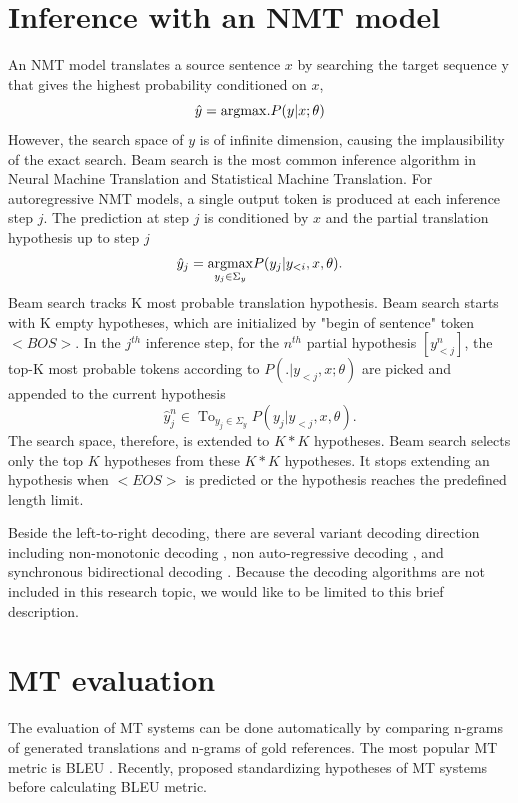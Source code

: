 \section{Inference with an NMT model} \label{sec:inference}
An NMT model translates a source sentence $x$ by searching the target sequence y that gives the highest probability conditioned on $x$,
\begin{equation}
\hat{y} = \displaystyle{\mathop{\operatorname*{argmax}}}. P(y|x;\theta)
\end{equation}
However, the search space of $y$ is of infinite dimension, causing the implausibility of the exact search. Beam search \citep{Och98improving} is the most common inference algorithm in Neural Machine Translation and Statistical Machine Translation. For autoregressive NMT models, a single output token is produced at each inference step $j$. The prediction at step $j$ is conditioned by $x$ and the partial translation hypothesis up to step $j$
\begin{equation}
\hat{y}_j = \displaystyle{\mathop{\operatorname*{argmax}}_{y_j \in \Sigma_y}} P(y_j|y_{<i},x,\theta).
\end{equation}
Beam search tracks K most probable translation hypothesis. Beam search starts with K empty hypotheses, which are initialized by "begin of sentence" token $<BOS>$. In the $j^{th}$ inference step,
for the $n^{th}$ partial hypothesis $[y^{n}_{<j}]$, the top-K most probable tokens according to $P(.| y_{<j},x;\theta)$ are picked and appended to the current hypothesis
\begin{equation}
\hat{y}^n_j \in \displaystyle{\mathop{Top_{K}}_{y_j \in \Sigma_y}} P(y_j|y_{<j},x,\theta).
\end{equation}
The search space, therefore, is extended to $K*K$ hypotheses. Beam search selects only the top $K$ hypotheses from these $K*K$ hypotheses. It stops extending an hypothesis when $<EOS>$ is predicted or  the hypothesis reaches the predefined length limit. 

Beside the left-to-right decoding, there are several variant decoding direction including non-monotonic decoding \citep{Welleck19non}, non auto-regressive decoding \citep{Jiatao17non}, and synchronous bidirectional decoding \citep{Zhou19synchronous}. Because the decoding algorithms are not included in this research topic, we would like to be limited to this brief description.
\section{MT evaluation}
The evaluation of MT systems can be done automatically by comparing n-grams of generated translations and n-grams of gold references. The most popular MT metric is BLEU \citep{Papineni02bleu}. Recently, \citet{Post18A} proposed standardizing hypotheses of MT systems before calculating BLEU metric. 

